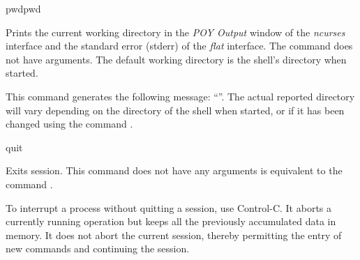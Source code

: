 
\begin{command}{pwd}{pwd}

\syntax{\obligatory{()}}

\begin{poydescription}
Prints the current working directory in the \emph{POY Output} window of
the \emph{ncurses} interface and the standard error (stderr) of the \emph{flat} interface.
The command  does not have arguments. The default
working directory is the shell's directory when \poy started.
\end{poydescription}

\begin{poyexamples}
{This command generates the following message: ``''. The actual reported
directory will vary depending on the directory of the shell when
\poy started, or if it has been changed using the command
.}
\end{poyexamples}

\begin{poyalso}
\end{poyalso}

\end{command}


\begin{command}{quit}{}

\syntax{\obligatory{()}}

\begin{poydescription}
Exits \poy session. This command does not have any arguments
 is equivalent to the command .
\end{poydescription}

\begin{statement}
To interrupt a process without quitting a \poy session, use Control-C.
It aborts a currently running operation but keeps all the previously accumulated
data in memory. It does not abort the current session, thereby permitting the 
entry of new commands and continuing the session.
\end{statement}

\begin{poyexamples}
\end{poyexamples}

\begin{poyalso}
\end{poyalso}
\end{command}

